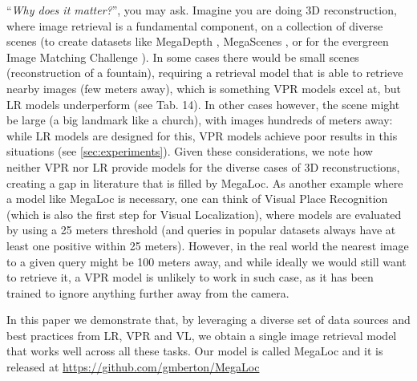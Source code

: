 ``\emph{Why does it matter?}'', you may ask.
Imagine you are doing 3D reconstruction, where image retrieval is a fundamental component, on a collection of diverse scenes (\eg to create datasets like MegaDepth \cite{Li_2018_megadepth}, MegaScenes \cite{Tung_2024_Megascenes}, or for the evergreen Image Matching Challenge \cite{bellavia_2024_image}).
In some cases there would be small scenes (\eg reconstruction of a fountain), requiring a retrieval model that is able to retrieve nearby images (few meters away), which is something VPR models excel at, but LR models underperform (see \cite{Berton_2022_benchmark} Tab. 14).
In other cases however, the scene might be large (\eg a big landmark like a church), with images hundreds of meters away: while LR models are designed for this, VPR models achieve poor results in this situations (see \cref{sec:experiments}).
Given these considerations, we note how neither VPR nor LR provide models for the diverse cases of 3D reconstructions, creating a gap in literature that is filled by MegaLoc.
% 
As another example where a model like MegaLoc is necessary, one can think of Visual Place Recognition (which is also the first step for Visual Localization), where models are evaluated by using a 25 meters threshold (and queries in popular datasets always have at least one positive within 25 meters).
However, in the real world the nearest image to a given query might be 100 meters away, and while ideally we would still want to retrieve it, a VPR model is unlikely to work in such case, as it has been trained to ignore anything further away from the camera.


In this paper we demonstrate that, by leveraging a diverse set of data sources and best practices from LR, VPR and VL, we obtain a single image retrieval model that works well across all these tasks. Our model is called MegaLoc and it is released at \url{https://github.com/gmberton/MegaLoc}
